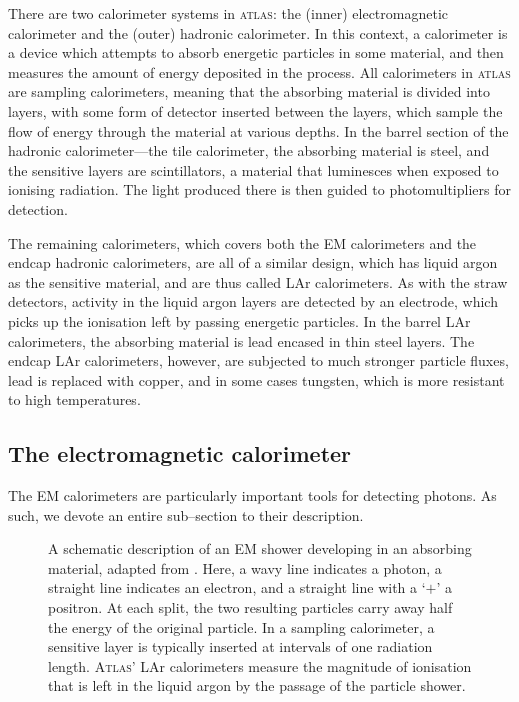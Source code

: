 There are two calorimeter systems in \textsc{atlas}: the (inner) electromagnetic calorimeter and the (outer) hadronic calorimeter. In this context, a calorimeter is a device which attempts to absorb energetic particles in some material, and then measures the amount of energy deposited in the process. All calorimeters in \textsc{atlas} are sampling calorimeters, meaning that the absorbing material is divided into layers, with some form of detector inserted between the layers, which sample the flow of energy through the material at various depths. In the barrel section of the hadronic calorimeter---the tile calorimeter, the absorbing material is steel, and the sensitive layers are scintillators, a material that luminesces when exposed to ionising radiation. The light produced there is then guided to photomultipliers for detection.

The remaining calorimeters, which covers both the EM calorimeters and the endcap hadronic calorimeters, are all of a similar design, which has liquid argon as the sensitive material, and are thus called LAr calorimeters. As with the straw detectors, activity in the liquid argon layers are detected by an electrode, which picks up the ionisation left by passing energetic particles. In the barrel LAr calorimeters, the absorbing material is lead encased in thin steel layers. The endcap LAr calorimeters, however, are subjected to much stronger particle fluxes, lead is replaced with copper, and in some cases tungsten, which is more resistant to high temperatures.

\subsection{The electromagnetic calorimeter}

The EM calorimeters are particularly important tools for detecting photons. As such, we devote an entire sub--section to their description.

\begin{figure}[htp]
\begin{minipage}[b]{.69\textwidth}
\begin{infilsf}\footnotesize

\end{infilsf}
\end{minipage}\hfill
\begin{minipage}[b]{.3\textwidth}
\caption{A schematic description of an EM shower developing in an absorbing material, adapted from \cite{fernow:sampcal}. Here, a wavy line indicates a photon, a straight line indicates an electron, and a straight line with a `$+$' a positron. At each split, the two resulting particles carry away half the energy of the original particle. In a sampling calorimeter, a sensitive layer is typically inserted at intervals of one radiation length. \textsc{Atlas}' LAr calorimeters measure the magnitude of ionisation that is left in the liquid argon by the passage of the particle shower.
\label{emshower}
}
\end{minipage}
\end{figure}

